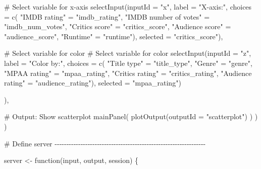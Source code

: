 \documentclass[
  letterpaper,
  DIV=11,
  numbers=noendperiod]{scrreprt}
\newenvironment{Shaded}{\begin{snugshade}}{\end{snugshade}}
\newcommand{\AttributeTok}[1]{\textcolor[rgb]{0.40,0.46,0.14}{#1}}
\newcommand{\CommentTok}[1]{\textcolor[rgb]{0.37,0.37,0.37}{#1}}
\newcommand{\ControlFlowTok}[1]{\textcolor[rgb]{0.00,0.46,0.62}{#1}}
\newcommand{\FunctionTok}[1]{\textcolor[rgb]{0.28,0.35,0.67}{#1}}
\newcommand{\NormalTok}[1]{\textcolor[rgb]{0.00,0.46,0.62}{#1}}
\newcommand{\OtherTok}[1]{\textcolor[rgb]{0.00,0.46,0.62}{#1}}
\newcommand{\StringTok}[1]{\textcolor[rgb]{0.13,0.47,0.30}{#1}}
\begin{document}
\begin{Shaded}
\begin{Highlighting}[]
      \CommentTok{\# Select variable for x{-}axis}
      \FunctionTok{selectInput}\NormalTok{(}\AttributeTok{inputId =} \StringTok{"x"}\NormalTok{, }
                  \AttributeTok{label =} \StringTok{"X{-}axis:"}\NormalTok{,}
                  \AttributeTok{choices =} \FunctionTok{c}\NormalTok{(}
                    \StringTok{"IMDB rating"}          \OtherTok{=} \StringTok{"imdb\_rating"}\NormalTok{, }
                    \StringTok{"IMDB number of votes"} \OtherTok{=} \StringTok{"imdb\_num\_votes"}\NormalTok{, }
                    \StringTok{"Critics score"}        \OtherTok{=} \StringTok{"critics\_score"}\NormalTok{, }
                    \StringTok{"Audience score"}       \OtherTok{=} \StringTok{"audience\_score"}\NormalTok{, }
                    \StringTok{"Runtime"}              \OtherTok{=} \StringTok{"runtime"}\NormalTok{), }
                  \AttributeTok{selected =} \StringTok{"critics\_score"}\NormalTok{),}
      
      \CommentTok{\# Select variable for color}
      \CommentTok{\# Select variable for color}
      \FunctionTok{selectInput}\NormalTok{(}\AttributeTok{inputId =} \StringTok{"z"}\NormalTok{, }
                  \AttributeTok{label =} \StringTok{"Color by:"}\NormalTok{,}
                  \AttributeTok{choices =} \FunctionTok{c}\NormalTok{(}
                    \StringTok{"Title type"} \OtherTok{=} \StringTok{"title\_type"}\NormalTok{, }
                    \StringTok{"Genre"} \OtherTok{=} \StringTok{"genre"}\NormalTok{, }
                    \StringTok{"MPAA rating"} \OtherTok{=} \StringTok{"mpaa\_rating"}\NormalTok{, }
                    \StringTok{"Critics rating"} \OtherTok{=} \StringTok{"critics\_rating"}\NormalTok{, }
                    \StringTok{"Audience rating"} \OtherTok{=} \StringTok{"audience\_rating"}\NormalTok{),}
                  \AttributeTok{selected =} \StringTok{"mpaa\_rating"}\NormalTok{)}
      
\NormalTok{    ),}
    
    \CommentTok{\# Output: Show scatterplot}
    \FunctionTok{mainPanel}\NormalTok{(}
      \FunctionTok{plotOutput}\NormalTok{(}\AttributeTok{outputId =} \StringTok{"scatterplot"}\NormalTok{)}
\NormalTok{    )}
\NormalTok{  )}
\NormalTok{)}

\CommentTok{\# Define server {-}{-}{-}{-}{-}{-}{-}{-}{-}{-}{-}{-}{-}{-}{-}{-}{-}{-}{-}{-}{-}{-}{-}{-}{-}{-}{-}{-}{-}{-}{-}{-}{-}{-}{-}{-}{-}{-}{-}{-}{-}{-}{-}{-}{-}{-}{-}{-}{-}{-}{-}{-}{-}{-}{-}{-}{-}{-}{-}{-}{-}{-}{-}{-}}

\NormalTok{server }\OtherTok{\textless{}{-}} \ControlFlowTok{function}\NormalTok{(input, output, session) \{}
  

\end{Highlighting}
\end{Shaded}
\end{document}
